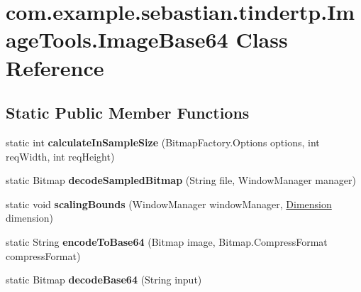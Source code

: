 \hypertarget{classcom_1_1example_1_1sebastian_1_1tindertp_1_1ImageTools_1_1ImageBase64}{}\section{com.\+example.\+sebastian.\+tindertp.\+Image\+Tools.\+Image\+Base64 Class Reference}
\label{classcom_1_1example_1_1sebastian_1_1tindertp_1_1ImageTools_1_1ImageBase64}
\subsection*{Static Public Member Functions}
\begin{DoxyCompactItemize}
\item 
static int {\bfseries calculate\+In\+Sample\+Size} (Bitmap\+Factory.\+Options options, int req\+Width, int req\+Height)\hypertarget{classcom_1_1example_1_1sebastian_1_1tindertp_1_1ImageTools_1_1ImageBase64_af285e950500c909a3b064558cd2e1dbd}{}\label{classcom_1_1example_1_1sebastian_1_1tindertp_1_1ImageTools_1_1ImageBase64_af285e950500c909a3b064558cd2e1dbd}

\item 
static Bitmap {\bfseries decode\+Sampled\+Bitmap} (String file, Window\+Manager manager)\hypertarget{classcom_1_1example_1_1sebastian_1_1tindertp_1_1ImageTools_1_1ImageBase64_abe76e890abe7de3f78ea1192a7dfed7b}{}\label{classcom_1_1example_1_1sebastian_1_1tindertp_1_1ImageTools_1_1ImageBase64_abe76e890abe7de3f78ea1192a7dfed7b}

\item 
static void {\bfseries scaling\+Bounds} (Window\+Manager window\+Manager, \hyperlink{classcom_1_1example_1_1sebastian_1_1tindertp_1_1commonTools_1_1Dimension}{Dimension} dimension)\hypertarget{classcom_1_1example_1_1sebastian_1_1tindertp_1_1ImageTools_1_1ImageBase64_a605d421a574e6bdbf3d586a3ec481a10}{}\label{classcom_1_1example_1_1sebastian_1_1tindertp_1_1ImageTools_1_1ImageBase64_a605d421a574e6bdbf3d586a3ec481a10}

\item 
static String {\bfseries encode\+To\+Base64} (Bitmap image, Bitmap.\+Compress\+Format compress\+Format)\hypertarget{classcom_1_1example_1_1sebastian_1_1tindertp_1_1ImageTools_1_1ImageBase64_a23bf5724833607045829525fb82a1c85}{}\label{classcom_1_1example_1_1sebastian_1_1tindertp_1_1ImageTools_1_1ImageBase64_a23bf5724833607045829525fb82a1c85}

\item 
static Bitmap {\bfseries decode\+Base64} (String input)\hypertarget{classcom_1_1example_1_1sebastian_1_1tindertp_1_1ImageTools_1_1ImageBase64_a1c57a6e5a8ba9401e5d4782f27e155d8}{}\label{classcom_1_1example_1_1sebastian_1_1tindertp_1_1ImageTools_1_1ImageBase64_a1c57a6e5a8ba9401e5d4782f27e155d8}

\end{DoxyCompactItemize}
